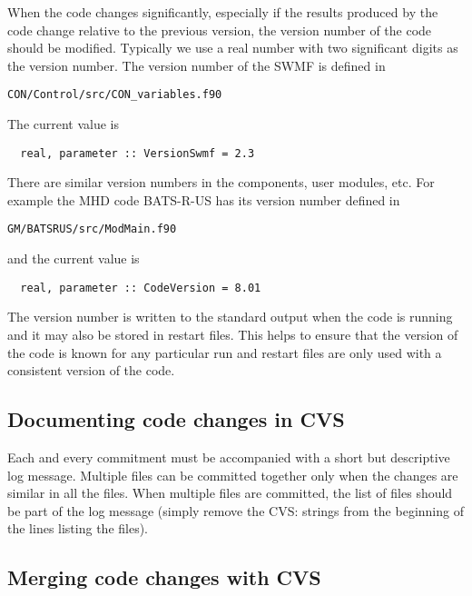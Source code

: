 \documentclass{article}
\begin{document}
When the code changes significantly, especially if the results produced
by the code change relative to the previous version, the version number
of the code should be modified. Typically we use a real number with two
significant digits as the version number. The version number of the SWMF 
is defined in 
\begin{verbatim}
CON/Control/src/CON_variables.f90
\end{verbatim}
The current value is
\begin{verbatim}
  real, parameter :: VersionSwmf = 2.3
\end{verbatim}
There are similar version numbers in the components, user modules, etc.
For example the MHD code BATS-R-US has its version number defined in
\begin{verbatim}
GM/BATSRUS/src/ModMain.f90
\end{verbatim}
and the current value is
\begin{verbatim}
  real, parameter :: CodeVersion = 8.01
\end{verbatim}
The version number is written to the standard output when the code is 
running and it may also be stored in restart files. This helps to 
ensure that the version of the code is known for any particular run
and restart files are only used with a consistent version of the code.

\subsection{Documenting code changes in CVS}

Each and every commitment must be accompanied with a short but descriptive 
log message. Multiple files can be committed together only when the changes
are similar in all the files. When multiple files are committed, the list of
files should be part of the log message (simply remove the CVS: strings
from the beginning of the lines listing the files).

\subsection{Merging code changes with CVS}
\end{document}
